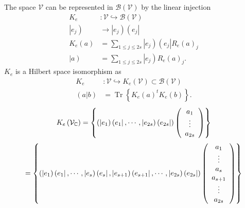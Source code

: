 \documentclass[aps,preprint]{revtex4}%
\begin{document}
The space $\mathcal{V}$ can be represented in $\mathcal{B}\left(
\mathcal{V}\right)  $ by the linear injection
\begin{align}
K_{e}  &  :\mathcal{V\hookrightarrow B}\left(  \mathcal{V}\right) \\
\left\vert e_{j}\right)   &  \rightarrow\left\vert e_{j}\right)  \left(
e_{j}\right\vert \\
K_{e}\left(  a\right)   &  =\sum\limits_{1\leq j\leq2s}\left\vert
e_{j}\right)  \left(  e_{j}\right\vert R_{e}\left(  a\right)  _{j}\\
\left\vert a\right)   &  =\sum\limits_{1\leq j\leq2s}\left\vert e_{j}\right)
R_{e}\left(  a\right)  _{j}.
\end{align}
$K_{e}$ is a Hilbert space isomorphism as
\begin{align}
K_{e}  &  :\mathcal{V\hookrightarrow}K_{e}\left(  \mathcal{V}\right)
\subset\mathcal{B}\left(  \mathcal{V}\right) \\
\left(  \left.  a\right\vert b\right)   &  =\operatorname{Tr}\left\{
K_{e}\left(  a\right)  ^{t}K_{e}\left(  b\right)  \right\}  .
\end{align}%
\begin{equation}
K_{e}\left(  \mathcal{V}_{\mathbb{C}}\right)  =\left\{  \left(  \left\vert
e_{1}\right)  \left(  e_{1}\right\vert ,\cdots,\left\vert e_{2s}\right)
\left(  e_{2s}\right\vert \right)  \left(
\begin{array}
[c]{c}%
a_{1}\\
\vdots\\
a_{2s}%
\end{array}
\right)  \right\}
\end{equation}%
\begin{equation}
=\left\{  \left(  \left\vert e_{1}\right)  \left(  e_{1}\right\vert
,\cdots,\left\vert e_{s}\right)  \left(  e_{s}\right\vert ,\left\vert
e_{s+1}\right)  \left(  e_{s+1}\right\vert ,\cdots,\left\vert e_{2s}\right)
\left(  e_{2s}\right\vert \right)  \left(
\begin{array}
[c]{c}%
a_{1}\\
\vdots\\
a_{s}\\
a_{s+1}\\
\vdots\\
a_{2s}%
\end{array}
\right)  \right\}
\end{equation}
%
\end{document}
